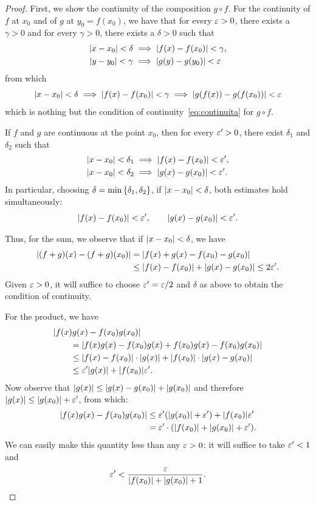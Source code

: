   \begin{proof}
  First, we show the continuity
  of the composition $g\circ f$.
  For the continuity of $f$ at $x_0$ and of $g$ at $y_0=f(x_0)$,
  we have that for every $\varepsilon>0$, there exists a $\gamma>0$
  and for every $\gamma>0$, there exists a $\delta>0$ such that
  \begin{align*}
   {\left|x-x_0\right|}< \delta &\implies {\left|f(x)-f(x_0)\right|}<\gamma,\\
   {\left|y-y_0\right|}< \gamma & \implies {\left|g(y)-g(y_0)\right|}<\varepsilon
  \end{align*}
  from which
  \[
  {\left|x-x_0\right|}< \delta
  \implies {\left|f(x)-f(x_0)\right|}< \gamma
  \implies {\left|g(f(x))-g(f(x_0))\right|} < \varepsilon
  \]
  which is nothing but the condition of
  continuity~\eqref{eq:continuita} for $g\circ f$.
  
  If $f$ and $g$ are continuous at the point $x_0$,
  then for every $\varepsilon'>0$, there exist $\delta_1$
  and $\delta_2$ such that
  \begin{align*}
   {\left|x-x_0\right|} < \delta_1 &\implies {\left|f(x)-f(x_0)\right|} < \varepsilon',
   \\
   {\left|x-x_0\right|} < \delta_2 &\implies {\left|g(x)-g(x_0)\right|} < \varepsilon'.
  \end{align*}
  In particular, choosing $\delta = \min{\left\{ \delta_1,\delta_2 \right\}}$,
  if ${\left|x-x_0\right|} < \delta$, both estimates hold simultaneously:
  \[
   {\left|f(x)-f(x_0)\right|}< \varepsilon', \qquad
   {\left|g(x)-g(x_0)\right|}< \varepsilon'.
  \]
  
  Thus, for the sum, we observe that if ${\left|x-x_0\right|}<\delta$,
  we have
  \begin{align*}
   {\left|(f+g)(x) - (f+g)(x_0)\right|}
    &= {\left|f(x)+g(x)-f(x_0)-g(x_0)\right|}\\
    &\le {\left|f(x)-f(x_0)\right|} + {\left|g(x)-g(x_0)\right|}
    \le 2 \varepsilon'.
  \end{align*}
  Given $\varepsilon>0$, it will suffice to choose $\varepsilon' = \varepsilon / 2$
  and $\delta$ as above to obtain the condition of continuity.
  
  For the product, we have
  \begin{align*}
    \MoveEqLeft \abs{f(x)g(x)-f(x_0)g(x_0)}\\
    &= \abs{f(x)g(x) - f(x_0)g(x) + f(x_0)g(x) - f(x_0)g(x_0)}\\
        &\le \abs{f(x)-f(x_0)}\cdot\abs{g(x)} + \abs{f(x_0)}\cdot
    \abs{g(x)-g(x_0)} \\
    &\le \eps' \abs{g(x)} + \abs{f(x_0)} \eps'.
  \end{align*}
  Now observe that ${\left|g(x)\right|}\le {\left|g(x)-g(x_0)\right|} + {\left|g(x_0)\right|}$
  and therefore ${\left|g(x)\right|}\le {\left|g(x_0)\right|}+\varepsilon'$, from which:
  \begin{align*}
    {\left|f(x)g(x)-f(x_0)g(x_0)\right|}
    &\le \varepsilon' {\left( {\left|g(x_0)\right|}+\varepsilon' \right)} + {\left|f(x_0)\right|} \varepsilon' \\
    &= \varepsilon' \cdot({\left|f(x_0)\right|} + {\left|g(x_0)\right|} + \varepsilon').
  \end{align*}
  We can easily make this quantity less than
  any $\varepsilon>0$: it will suffice to take $\varepsilon'<1$ and
  \[
    \varepsilon' < \frac{\varepsilon}{{\left|f(x_0)\right|} + {\left|g(x_0)\right|} + 1}.
  \]
  

\end{proof}
